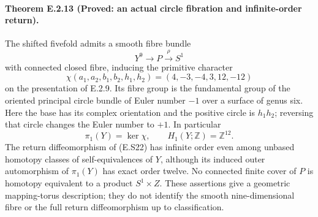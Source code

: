 \paragraph{Theorem E.2.13 (Proved: an actual circle fibration and infinite-order return).}
The shifted fivefold admits a smooth fibre bundle
\[
                  Y^9\longrightarrow P\stackrel{\rho}{\longrightarrow}S^1
 \tag{E.S22}
\]
with connected closed fibre, inducing the primitive character
\[
 \chi(a_1,a_2,b_1,b_2,h_1,h_2)
                    =(4,-3,-4,3,12,-12)
 \tag{E.S23}
\]
on the presentation of E.2.9. Its fibre group is the fundamental
group of the oriented principal circle bundle of Euler number
$-1$ over a surface of genus six. Here the base has its complex
orientation and the positive circle is $h_1h_2$; reversing that
circle changes the Euler number to $+1$. In particular
\[
 \pi_1(Y)=\ker\chi,\qquad H_1(Y;\mathbb Z)=\mathbb Z^{12}.
 \tag{E.S24}
\]
The return diffeomorphism of (E.S22) has infinite order even
among unbased homotopy classes of self-equivalences of $Y$,
although its induced outer automorphism of $\pi_1(Y)$ has
exact order twelve. No connected finite cover of $P$ is
homotopy equivalent to a product $S^1\times Z$.
These assertions give a geometric mapping-torus description;
they do not identify the smooth nine-dimensional fibre or
the full return diffeomorphism up to classification.

